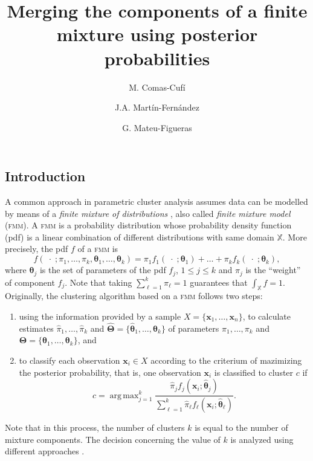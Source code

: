 \documentclass[10pt, a4paper]{article}
\title{Merging the components of a finite mixture using  posterior probabilities}
\author{M. Comas-Cufí \and J.A. Martín-Fernández \and G. Mateu-Figueras}
\DeclareMathOperator*{\argmax}{arg\,max}
\theoremstyle{definition}
\newcommand{\m}[1]{\boldsymbol{#1}}
\newcommand{\fmm}{\textsc{fmm}\xspace}
\begin{document}
\begin{spacing}{1.9}



\maketitle

\section{Introduction}


A common approach in parametric cluster analysis assumes data can be modelled by means of a \emph{finite mixture of distributions} \citep{fraley2002model}, also called \emph{finite mixture model} (\fmm). A \fmm is a probability distribution whose probability density function (pdf) is a linear combination of different distributions with same domain $\mathbb{X}$. More precisely, the pdf $f$ of a \fmm is
\begin{equation}\label{mixt}
f(\;\cdot\; ; \pi_1, \dots, \pi_k, \m\theta_1, \dots, \m\theta_k) = \pi_1 f_1(\;\cdot\; ; \m\theta_1) + \dots + \pi_k f_k(\;\cdot\; ; \m\theta_k),
\end{equation}
where $\m\theta_j$ is the set of parameters of the pdf $f_j$, $1\leq j \leq k$ and $\pi_j$ is the ``weight'' of component $f_j$. Note that taking $\sum_{\ell = 1}^k \pi_\ell = 1$ guarantees that  $\int_{\mathbb{X}}f = 1$. Originally, the clustering algorithm based on a \fmm follows two steps:
\begin{enumerate}
\item using the information provided by a sample $X=\{\m x_1, \dots, \m x_n\}$, to calculate estimates $\hat{\pi}_1, \dots, \hat{\pi}_k$ and $\hat{\m\Theta}=\{\hat{\m\theta}_1, \dots, \hat{\m\theta}_k\}$ of parameters $\pi_1, \dots, \pi_k$ and $\m\Theta=\{\m\theta_1, \dots, \m\theta_k\}$, and
\item to classify each observation $\m x_i \in X$ according to the criterium of mazimizing the posterior probability, that is, one observation $\m x_i$ is classified to cluster $c$ if
\begin{equation}\label{map_criteria}
c=\argmax_{j=1}^k \frac{ \hat{\pi}_j f_j(\m x_i ; \hat{\m\theta}_j) }{\sum_{\ell=1}^k \hat{\pi}_\ell f_\ell(\m x_i ; \hat{\m\theta}_\ell) }.
\end{equation}
\end{enumerate}
Note that in this process, the number of clusters $k$ is equal to the number of mixture components. The decision concerning the value of $k$ is analyzed using different approaches \citep{mclachlan2014components}.


\end{spacing}
\end{document}
